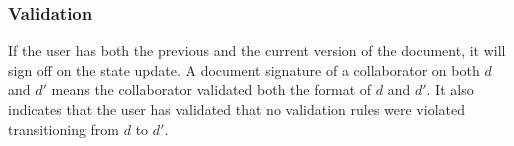\subsubsection{Validation}
If the user has both the previous and the current version of the document, it will sign off on the state update. A document signature of a collaborator on both $d$ and $d\prime$ means the collaborator validated both the format of $d$ and $d\prime$. It also indicates that the user has validated that no validation rules were violated transitioning from $d$ to $d\prime$.


 
 
 
